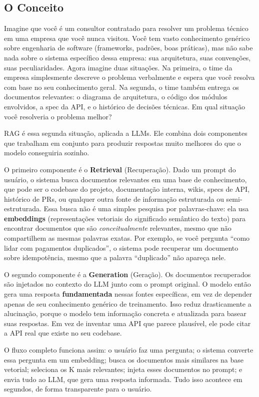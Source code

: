 \subsection{O Conceito}

Imagine que você é um consultor contratado para resolver um problema técnico em uma
empresa que você nunca visitou. Você tem vasto conhecimento genérico sobre engenharia
de software (frameworks, padrões, boas práticas), mas não sabe nada sobre o
sistema específico dessa empresa: sua arquitetura, suas convenções, suas peculiaridades.
Agora imagine duas situações. Na primeira, o time da empresa simplesmente descreve o
problema verbalmente e espera que você resolva com base no seu conhecimento geral. Na
segunda, o time também entrega os documentos relevantes:
o diagrama de arquitetura, o código dos módulos envolvidos, a spec da API, e o histórico
de decisões técnicas. Em qual situação você resolveria o problema melhor?

RAG é essa segunda situação, aplicada a LLMs. Ele combina dois componentes
que trabalham em conjunto para produzir respostas muito melhores do que
o modelo conseguiria sozinho.

O primeiro componente é o \textbf{Retrieval} (Recuperação). Dado um prompt do usuário,
o sistema busca documentos relevantes em uma base de conhecimento, que pode ser o
codebase do projeto, documentação interna, wikis, specs de API, histórico de PRs, ou
qualquer outra fonte de informação estruturada ou semi-estruturada. Essa busca não é
uma simples pesquisa por palavras-chave: ela usa \textbf{embeddings} (representações
vetoriais do significado semântico do texto) para encontrar documentos que são
\textit{conceitualmente} relevantes, mesmo que não compartilhem as mesmas palavras
exatas. Por exemplo, se você pergunta ``como lidar com pagamentos duplicados'', o
sistema pode recuperar um documento sobre idempotência, mesmo que a palavra ``duplicado''
não apareça nele.

O segundo componente é a \textbf{Generation} (Geração). Os documentos recuperados são
injetados no contexto do LLM junto com o prompt original. O modelo então gera uma
resposta \textbf{fundamentada} nessas fontes específicas, em vez de depender apenas
de seu conhecimento genérico de treinamento. Isso reduz drasticamente a alucinação,
porque o modelo tem informação concreta e atualizada para basear suas respostas. Em
vez de inventar uma API que parece plausível, ele pode citar a API real que existe no
seu codebase.

O fluxo completo funciona assim: o usuário faz uma pergunta; o sistema converte essa
pergunta em um embedding; busca os documentos mais similares na base vetorial;
seleciona os K mais relevantes; injeta esses documentos no prompt; e envia tudo ao
LLM, que gera uma resposta informada. Tudo isso acontece em segundos, de forma
transparente para o usuário.

